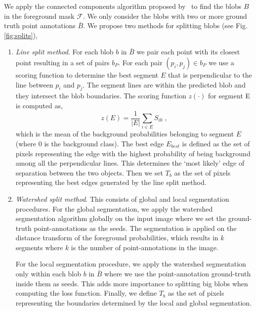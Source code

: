 \documentclass[runningheads]{llncs}
\begin{document}
We apply the connected components algorithm proposed by~\cite{wu2005optimizing} to find the blobs $B$ in the foreground mask $\mathcal{F}$. We only consider the blobs with two or more ground truth point annotations $\bar{B}$. We propose two methods for splitting blobs (see Fig. \ref{fig:splits}),

\begin{enumerate}
\item {\it Line split method}. For each blob $b$ in $\bar{B}$ we pair each point with its closest point resulting in a set of pairs $b_P$. For each pair $(p_i, p_j) \in b_P$ we use a scoring function to determine the best segment $E$ that is perpendicular to the line between $p_i$ and $p_j$. The segment lines are within the predicted blob and they intersect the blob boundaries. The scoring function $z(\cdot)$ for segment E is computed as,
\begin{equation}
z(E) = \frac{1}{|E|}\sum_{i \in E}S_{i0}\;,
\end{equation}
which is the mean of the background probabilities belonging to segment $E$ (where 0 is the background class). The best edge $E_{best}$ is defined as the set of pixels representing the edge with the highest probability of being background among all the perpendicular lines. This determines the `most likely' edge of separation between the two objects. Then we set $T_b$ as the set of pixels representing the best edges generated by the line split method.



\item {\it Watershed split method}. This consists of global and local segmentation procedures. For the global segmentation, we apply the watershed segmentation algorithm \cite{beucher1992morphological} globally on the input image where we set the ground-truth point-annotations as the seeds.  The segmentation is applied on the distance transform of the foreground probabilities, which results in $k$ segments where $k$ is the number of point-annotations in the image.

For the local segmentation procedure, we apply the watershed segmentation only within each blob $b$ in $\bar{B}$ where we use  the point-annotation ground-truth inside them as seeds. This adds more importance to splitting big blobs when computing the loss function. Finally, we define $T_b$ as the set of pixels representing the boundaries determined by the local and global segmentation.
\end{enumerate}
\end{document}
